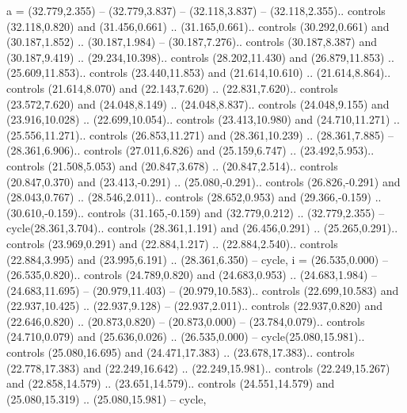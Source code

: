 {a} = {(32.779,2.355) -- (32.779,3.837) -- (32.118,3.837) -- (32.118,2.355).. controls (32.118,0.820) and (31.456,0.661) .. (31.165,0.661).. controls (30.292,0.661) and (30.187,1.852) .. (30.187,1.984) -- (30.187,7.276).. controls (30.187,8.387) and (30.187,9.419) .. (29.234,10.398).. controls (28.202,11.430) and (26.879,11.853) .. (25.609,11.853).. controls (23.440,11.853) and (21.614,10.610) .. (21.614,8.864).. controls (21.614,8.070) and (22.143,7.620) .. (22.831,7.620).. controls (23.572,7.620) and (24.048,8.149) .. (24.048,8.837).. controls (24.048,9.155) and (23.916,10.028) .. (22.699,10.054).. controls (23.413,10.980) and (24.710,11.271) .. (25.556,11.271).. controls (26.853,11.271) and (28.361,10.239) .. (28.361,7.885) -- (28.361,6.906).. controls (27.011,6.826) and (25.159,6.747) .. (23.492,5.953).. controls (21.508,5.053) and (20.847,3.678) .. (20.847,2.514).. controls (20.847,0.370) and (23.413,-0.291) .. (25.080,-0.291).. controls (26.826,-0.291) and (28.043,0.767) .. (28.546,2.011).. controls (28.652,0.953) and (29.366,-0.159) .. (30.610,-0.159).. controls (31.165,-0.159) and (32.779,0.212) .. (32.779,2.355) -- cycle(28.361,3.704).. controls (28.361,1.191) and (26.456,0.291) .. (25.265,0.291).. controls (23.969,0.291) and (22.884,1.217) .. (22.884,2.540).. controls (22.884,3.995) and (23.995,6.191) .. (28.361,6.350) -- cycle},
{i} = {(26.535,0.000) -- (26.535,0.820).. controls (24.789,0.820) and (24.683,0.953) .. (24.683,1.984) -- (24.683,11.695) -- (20.979,11.403) -- (20.979,10.583).. controls (22.699,10.583) and (22.937,10.425) .. (22.937,9.128) -- (22.937,2.011).. controls (22.937,0.820) and (22.646,0.820) .. (20.873,0.820) -- (20.873,0.000) -- (23.784,0.079).. controls (24.710,0.079) and (25.636,0.026) .. (26.535,0.000) -- cycle(25.080,15.981).. controls (25.080,16.695) and (24.471,17.383) .. (23.678,17.383).. controls (22.778,17.383) and (22.249,16.642) .. (22.249,15.981).. controls (22.249,15.267) and (22.858,14.579) .. (23.651,14.579).. controls (24.551,14.579) and (25.080,15.319) .. (25.080,15.981) -- cycle},
